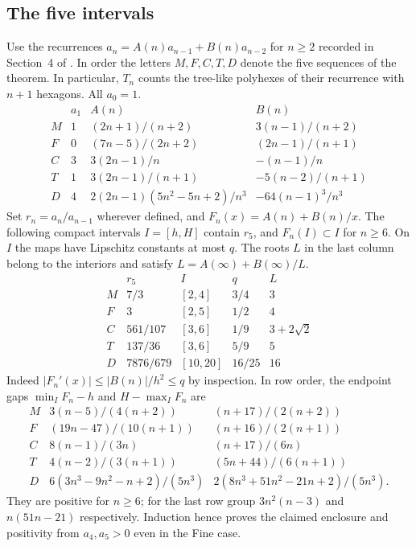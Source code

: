 \documentclass[11pt,a4paper]{article}
\numberwithin{equation}{section}
\theoremstyle{definition}
\theoremstyle{remark}
\begin{document}
\subsection{The five intervals}
Use the recurrences $a_n=A(n)a_{n-1}+B(n)a_{n-2}$ for $n\ge2$ recorded in Section~4 of \cite{r27reiwa:CGW}. In order the letters $M,F,C,T,D$ denote the five sequences of the theorem. In particular, $T_n$ counts the tree-like polyhexes of their recurrence with $n+1$ hexagons. All $a_0=1$.
\[
\begin{array}{c|c|c|c}
 & a_1&A(n)&B(n)\\\hline
 M&1&(2n+1)/(n+2)&3(n-1)/(n+2)\\
 F&0&(7n-5)/(2n+2)&(2n-1)/(n+1)\\
 C&3&3(2n-1)/n&-(n-1)/n\\
 T&1&3(2n-1)/(n+1)&-5(n-2)/(n+1)\\
 D&4&2(2n-1)(5n^2-5n+2)/n^3&-64(n-1)^3/n^3
\end{array}
\]
Set $r_n=a_n/a_{n-1}$ wherever defined, and $F_n(x)=A(n)+B(n)/x$. The following compact intervals $I=[h,H]$ contain $r_5$, and $F_n(I)\subset I$ for $n\ge6$. On $I$ the maps have Lipschitz constants at most $q$. The roots $L$ in the last column belong to the interiors and satisfy $L=A(\infty)+B(\infty)/L$.
\[
\begin{array}{c|c|c|c|c}
 &r_5&I&q&L\\\hline
 M&7/3 &[2,4]&3/4&3\\
 F&3 &[2,5]&1/2&4\\
 C&561/107 &[3,6]&1/9&3+2\sqrt2\\
 T&137/36 &[3,6]&5/9&5\\
 D&7876/679 &[10,20]&16/25&16
\end{array}
\]
Indeed $|F_n'(x)|\le |B(n)|/h^2\le q$ by inspection. In row order, the endpoint gaps $\min_I F_n-h$ and $H-\max_I F_n$ are
\[
\begin{array}{c|c|c}
M&3(n-5)/(4(n+2))&(n+17)/(2(n+2))\\
F&(19n-47)/(10(n+1))&(n+16)/(2(n+1))\\
C&8(n-1)/(3n)&(n+17)/(6n)\\
T&4(n-2)/(3(n+1))&(5n+44)/(6(n+1))\\
D&6(3n^3-9n^2-n+2)/(5n^3)&2(8n^3+51n^2-21n+2)/(5n^3).
\end{array}
\]
They are positive for $n\ge6$; for the last row group $3n^2(n-3)$ and $n(51n-21)$ respectively. Induction hence proves the claimed enclosure and positivity from $a_4,a_5>0$ even in the Fine case.
\end{document}

